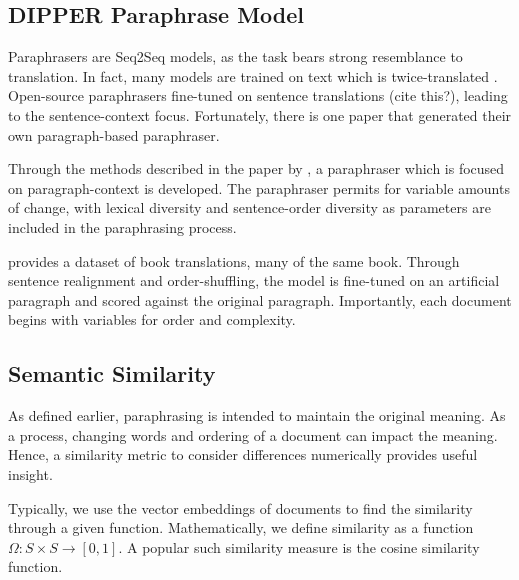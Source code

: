 \documentclass{l4proj}
\theoremstyle{definition}
\begin{document}
    \subsection{DIPPER Paraphrase Model}
        Paraphrasers are Seq2Seq models, as the task bears strong resemblance to translation. In fact, many models are trained on text which is twice-translated \citet{to french and back!}. Open-source paraphrasers fine-tuned on sentence translations (cite this?), leading to the sentence-context focus. Fortunately, there is one paper that generated their own paragraph-based paraphraser.

    
        
        Through the methods described in the paper by \citet{krishna2023paraphrasing}, a paraphraser which is focused on paragraph-context is developed. The paraphraser permits for variable amounts of change, with lexical diversity and sentence-order diversity as parameters are included in the paraphrasing process. 
        
        \citet{Par3_2022} provides a dataset of book translations, many of the same book. Through sentence realignment and order-shuffling, the model is fine-tuned on an artificial paragraph and scored against the original paragraph. Importantly, each document begins with variables for order and complexity. 

    \subsection{Semantic Similarity}
        As defined earlier, paraphrasing is intended to maintain the original meaning. As a process, changing words and ordering of a document can impact the meaning. Hence, a similarity metric to consider differences numerically provides useful insight.

        Typically, we use the vector embeddings of documents to find the similarity through a given function. Mathematically, we define similarity as a function $\Omega : S \times S \rightarrow [0, 1]$. A popular such similarity measure is the cosine similarity function. 
\end{document}
